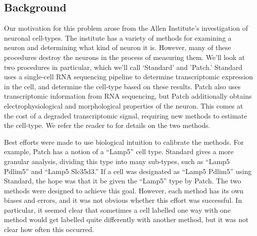 \begin{itemize}

\subsection{Background}

Our motivation for this problem arose from the Allen Institute's investigation of neuronal cell-types.  The institute has a variety of methods for examining a neuron and determining what kind of neuron it is.  However, many of these procedures destroy the neurons in the process of measuring them.  We'll look at two procedures in particular, which we'll call `Standard' and 'Patch.'  Standard uses a single-cell RNA sequencing pipeline to determine transcriptomic expression in the cell, and determine the cell-type based on these results.  Patch also uses transcriptomic information from RNA sequencing, but Patch additionally obtains electrophysiological and morphological properties of the neuron.  This comes at the cost of a degraded transcriptomic signal, requiring new methods to estimate the cell-type.  We refer the reader to \citep{tasic2017shared} for details on the two methods.

Best efforts were made to use biological intuition to calibrate the methods.  For example, Patch has a notion of a ``Lamp5'' cell type.  Standard gives a more granular analysis, dividing this type into many sub-types, such as ``Lamp5 Pdlim5'' and ``Lamp5 Slc35d3.''  If a cell was designated as ``Lamp5 Pdlim5'' using Standard, the hope was that it be given the ``Lamp5'' type by Patch.  The two methods were designed to achieve this goal.  However, each method has its own biases and errors, and it was not obvious whether this effort was successful.  In particular, it seemed clear that sometimes a cell labelled one way with one method would get labelled quite differently with another method, but it was not clear how often this occurred.  


\end{itemize}

